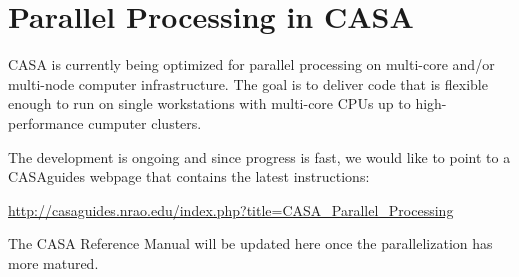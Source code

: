 
\chapter{Parallel Processing in CASA}
\label{chapter:parallel}


CASA is currently being optimized for parallel processing on
multi-core and/or multi-node computer infrastructure. The goal is to
deliver code that is flexible enough to run on single workstations
with multi-core CPUs up to high-performance cumputer clusters. 

The development is ongoing and since progress is fast, we would like
to point to a CASAguides webpage that contains the latest instructions: 

\url{http://casaguides.nrao.edu/index.php?title=CASA_Parallel_Processing}

The CASA Reference Manual will be updated here once the parallelization has
more matured.